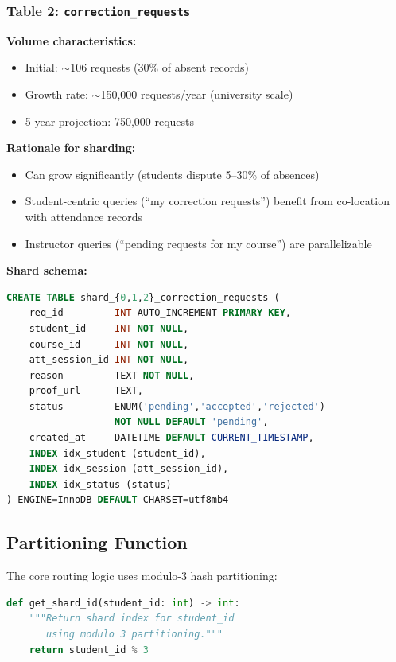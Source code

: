 \documentclass[conference]{IEEEtran}
\begin{document}
\subsubsection{Table 2: \texttt{correction\_requests}}

\textbf{Volume characteristics:}
\begin{itemize}
    \item Initial: $\sim$106 requests (30\% of absent records)
    \item Growth rate: $\sim$150,000 requests/year (university scale)
    \item 5-year projection: 750,000 requests
\end{itemize}

\textbf{Rationale for sharding:}
\begin{itemize}
    \item Can grow significantly (students dispute 5--30\% of absences)
    \item Student-centric queries (``my correction requests'') benefit from co-location with attendance records
    \item Instructor queries (``pending requests for my course'') are parallelizable
\end{itemize}

\textbf{Shard schema:}
\begin{lstlisting}[language=SQL]
CREATE TABLE shard_{0,1,2}_correction_requests (
    req_id         INT AUTO_INCREMENT PRIMARY KEY,
    student_id     INT NOT NULL,
    course_id      INT NOT NULL,
    att_session_id INT NOT NULL,
    reason         TEXT NOT NULL,
    proof_url      TEXT,
    status         ENUM('pending','accepted','rejected') 
                   NOT NULL DEFAULT 'pending',
    created_at     DATETIME DEFAULT CURRENT_TIMESTAMP,
    INDEX idx_student (student_id),
    INDEX idx_session (att_session_id),
    INDEX idx_status (status)
) ENGINE=InnoDB DEFAULT CHARSET=utf8mb4
\end{lstlisting}

\subsection{Partitioning Function}

The core routing logic uses modulo-3 hash partitioning:

\begin{lstlisting}[language=Python]
def get_shard_id(student_id: int) -> int:
    """Return shard index for student_id 
       using modulo 3 partitioning."""
    return student_id % 3
\end{lstlisting}
\end{document}
